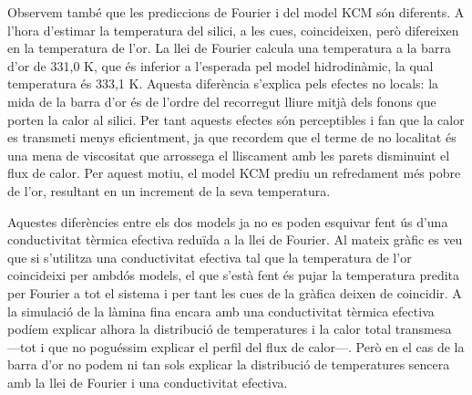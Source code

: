 \documentclass{article}
\begin{document}
Observem tamb\'{e} que les prediccions de Fourier i del model KCM s\'{o}n diferents. A l'hora d'estimar la temperatura del silici, a les cues, coincideixen, per\`{o} difereixen en la temperatura de l'or. La llei de Fourier calcula una temperatura a la barra d'or de 331,0 K, que \'{e}s inferior a l'esperada pel model hidrodin\`{a}mic, la qual temperatura \'{e}s 333,1 K. Aquesta difer\`{e}ncia s'explica pels efectes no locals: la mida de la barra d'or \'{e}s de l'ordre del recorregut lliure mitj\`{a} dels fonons que porten la calor al silici. Per tant aquests efectes s\'{o}n perceptibles i fan que la calor es transmeti menys eficientment, ja que recordem que el terme de no localitat \'{e}s una mena de viscositat que arrossega el lliscament amb les parets disminuint el flux de calor. Per aquest motiu, el model KCM prediu un refredament m\'{e}s pobre de l'or, resultant en un increment de la seva temperatura.

Aquestes difer\`{e}ncies entre els dos models ja no es poden esquivar fent \'{u}s d'una conductivitat t\`{e}rmica efectiva redu\"{i}da a la llei de Fourier. Al mateix gr\`{a}fic es veu que si s'utilitza una conductivitat efectiva tal que la temperatura de l'or coincideixi per ambd\'{o}s models, el que s'est\`{a} fent \'{e}s pujar la temperatura predita per Fourier a tot el sistema i per tant les cues de la gr\`{a}fica deixen de coincidir. A la simulaci\'{o} de la l\`{a}mina fina encara amb una conductivitat t\`{e}rmica efectiva pod\'{i}em explicar alhora la distribuci\'{o} de temperatures i la calor total transmesa ---tot i que no pogu\'{e}ssim explicar el perfil del flux de calor---. Per\`{o} en el cas de la barra d'or no podem ni tan sols explicar la distribuci\'{o} de temperatures sencera amb la llei de Fourier i una conductivitat efectiva.
\end{document}
